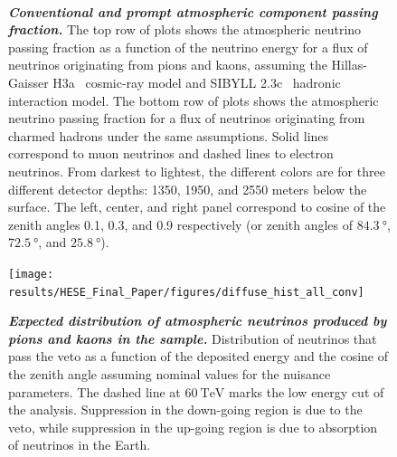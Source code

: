 \begin{figure}
	\centering
	 \\
	\caption{\textbf{\textit{Conventional and prompt atmospheric component passing fraction.}}
		The top row of plots shows the atmospheric neutrino passing fraction as a function of the neutrino energy for a flux of neutrinos originating from pions and kaons, assuming the Hillas-Gaisser H3a~\cite{Gaisser:2013bla,Gaisser:2011cc,Hillas:2006ms} cosmic-ray model and SIBYLL 2.3c~\cite{Riehn:2017mfm} hadronic interaction model.
		The bottom row of plots shows the atmospheric neutrino passing fraction for a flux of neutrinos originating from charmed hadrons under the same assumptions.
		Solid lines correspond to muon neutrinos and dashed lines to electron neutrinos.
		From darkest to lightest, the different colors are for three different detector depths: 1350, 1950, and 2550 meters below the surface.
		The left, center, and right panel correspond to cosine of the zenith angles 0.1, 0.3, and 0.9 respectively (or zenith angles of $\SI{84.3}\degree$, $\SI{72.5}\degree$, and $\SI{25.8}\degree$).}\label{fig:passingfraction}
\end{figure}

\begin{figure}
	\centering
	\texttt{[image: results/HESE\_Final\_Paper/figures/diffuse\_hist\_all\_conv]}
	\caption{\textbf{\textit{Expected distribution of atmospheric neutrinos produced by pions and kaons in the sample.}} Distribution of neutrinos that pass the veto as a function of the deposited energy and the cosine of the zenith angle assuming nominal values for the nuisance parameters.
		The dashed line at $\SI{60}\TeV$ marks the low energy cut of the analysis.
		Suppression in the down-going region is due to the veto, while suppression in the up-going region is due to absorption of neutrinos in the Earth.}\label{fig:conventional_distribution}
\end{figure}


